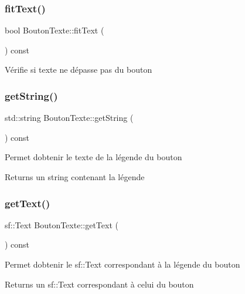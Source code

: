 \subsubsection{\texorpdfstring{fit\+Text()}{fitText()}}
{\footnotesize\ttfamily bool Bouton\+Texte\+::fit\+Text (\begin{DoxyParamCaption}{ }\end{DoxyParamCaption}) const\hspace{0.3cm}{\ttfamily [protected]}}

Vérifie si texte ne dépasse pas du bouton \mbox{\label{classBoutonTexte_a621710e92704902ac505a89a9d1ef67b}} 
\subsubsection{\texorpdfstring{get\+String()}{getString()}}
{\footnotesize\ttfamily std\+::string Bouton\+Texte\+::get\+String (\begin{DoxyParamCaption}{ }\end{DoxyParamCaption}) const}

Permet d\textquotesingle{}obtenir le texte de la légende du bouton \begin{DoxyReturn}{Returns}
un string contenant la légende 
\end{DoxyReturn}
\mbox{\label{classBoutonTexte_a426af0b13653bc55cb4652ce4d1fe985}} 
\subsubsection{\texorpdfstring{get\+Text()}{getText()}}
{\footnotesize\ttfamily sf\+::\+Text Bouton\+Texte\+::get\+Text (\begin{DoxyParamCaption}{ }\end{DoxyParamCaption}) const}

Permet d\textquotesingle{}obtenir le sf\+::\+Text correspondant à la légende du bouton \begin{DoxyReturn}{Returns}
un sf\+::\+Text correspondant à celui du bouton 
\end{DoxyReturn}
\mbox{\label{classBoutonTexte_ab1ffba678bd0b224149859d2925cb49b}} 
